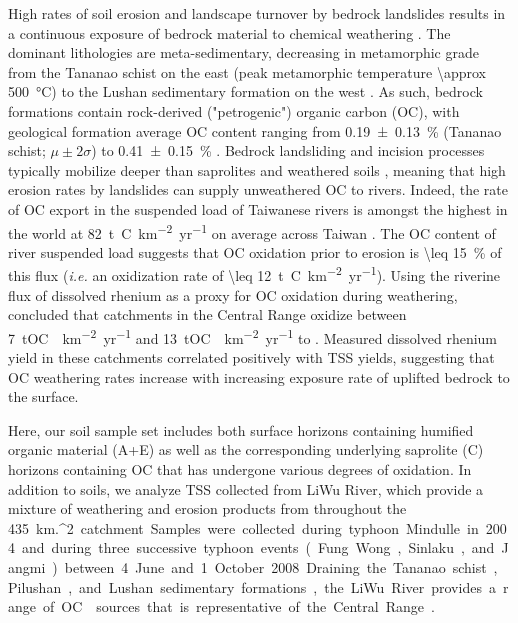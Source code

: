 High rates of soil erosion and landscape turnover by bedrock landslides \citep{Hovius:2000ht,Lin:2008fy,Hilton:2012dt} results in a continuous exposure of bedrock material to chemical weathering \citep{Hilton:2012dt,Emberson:2016fp}. The dominant lithologies are meta-sedimentary, decreasing in metamorphic grade from the Tananao schist on the east (peak metamorphic temperature \SI{\approx 500}{\celsius}) to the Lushan sedimentary formation on the west \citep[\SI{\leq 150}{\celsius}; Figure \ref{Ch6Fig:S1};][]{Beyssac:2007wg}. As such, bedrock formations contain rock-derived ("petrogenic") organic carbon (OC), with geological formation average OC content ranging from \SI{0.19 \pm 0.13}{\%} (Tananao schist; $\mu \pm 2\sigma$) to \SI{0.41 \pm 0.15}{\%} \citep[Lushan formation;][]{Hilton:2010cg}. Bedrock landsliding and incision processes typically mobilize deeper than saprolites and weathered soils \citep{Larsen:2010dr}, meaning that high erosion rates by landslides can supply unweathered OC to rivers. Indeed, the rate of OC export in the suspended load of Taiwanese rivers is amongst the highest in the world at \SI{82}{t.C.km^{-2}.yr^{-1}} on average across Taiwan \citep{Hilton:2011jw}. The OC content of river suspended load suggests that OC oxidation prior to erosion is \SI{\leq 15}{\%} of this flux (\textit{i.e.} an oxidization rate of \SI{\leq 12}{t.C.km^{-2}.yr^{-1}}). Using the riverine flux of dissolved rhenium as a proxy for OC oxidation during weathering, \citet{Hilton:2014dh} concluded that catchments in the Central Range oxidize between \SI{7}{tOC.km^{-2}.yr^{-1}} and \SI{13}{tOC.km^{-2}.yr^{-1}} to . Measured dissolved rhenium yield in these catchments correlated positively with TSS yields, suggesting that OC weathering rates increase with increasing exposure rate of uplifted bedrock to the surface.

Here, our soil sample set includes both surface horizons containing humified organic material (A+E) as well as the corresponding underlying saprolite (C) horizons containing OC that has undergone various degrees of oxidation. In addition to soils, we analyze TSS collected from LiWu River, which provide a mixture of weathering and erosion products from throughout the \SI{435}{km.^{2}} catchment. Samples were collected during typhoon Mindulle in 2004 and during three successive typhoon events (Fung Wong, Sinlaku, and Jangmi) between 4 June and 1 October 2008. Draining the Tananao schist, Pilushan, and Lushan sedimentary formations, the LiWu River provides a range of OC sources that is representative of the Central Range \citep{Hilton:2010cg}.

